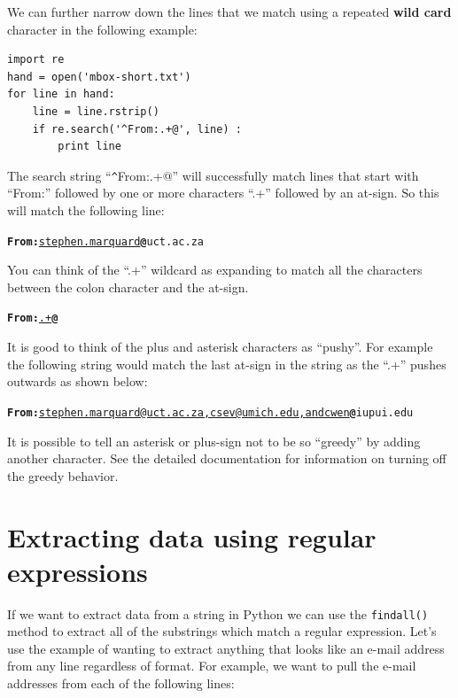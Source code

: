 \documentclass[11pt]{book}
\begin{document}
We can further narrow down the lines that we match using a repeated {\bf wild card} character in the following example:

\beforeverb
\begin{verbatim}
import re
hand = open('mbox-short.txt')
for line in hand:
    line = line.rstrip()
    if re.search('^From:.+@', line) :
        print line
\end{verbatim}
\afterverb
%
The search string ``\verb"^"From:.+@'' will successfully match lines that start with ``From:'' followed by one or more characters ``.+'' followed by an at-sign.  So this will match the following line:

\beforeverb
\begin{alltt}
{\bf From:}\underline{ stephen.marquard}{\bf @}uct.ac.za
\end{alltt}
\afterverb

You can think of the ``.+'' wildcard as expanding to match all the characters between the 
colon character and the at-sign.  

\beforeverb
\begin{alltt}
{\bf From:}\underline{.+}{\bf @}
\end{alltt}
\afterverb

It is good to think of the plus and asterisk characters as ``pushy''.  For example the following string would match the last at-sign in the string as the ``.+'' pushes outwards as shown below:

\beforeverb
\begin{alltt}
{\bf From:}\underline{ stephen.marquard@uct.ac.za, csev@umich.edu, and cwen}{\bf @}iupui.edu
\end{alltt}
\afterverb

It is possible to tell an asterisk or plus-sign not to be so ``greedy'' by adding 
another character.   See the detailed documentation for information on turning off the 
greedy behavior.

\section{Extracting data using regular expressions}

If we want to extract data from a string in Python we can use the {\tt findall()} method to extract all of the substrings which match a regular expression.  Let's use the example of wanting to extract anything that looks like an e-mail address from any line regardless of format.  For example, we want to pull the e-mail addresses from each of the following lines:
\end{document}
